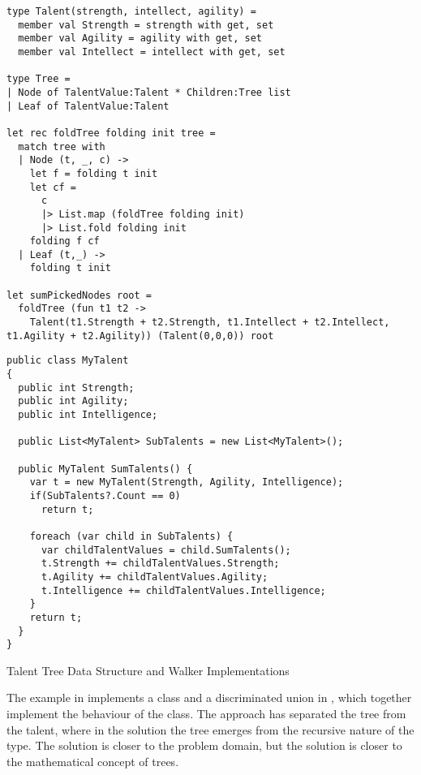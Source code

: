 \begin{listing}[H]
  \begin{verbatim}
type Talent(strength, intellect, agility) =
  member val Strength = strength with get, set
  member val Agility = agility with get, set
  member val Intellect = intellect with get, set

type Tree =
| Node of TalentValue:Talent * Children:Tree list
| Leaf of TalentValue:Talent

let rec foldTree folding init tree =
  match tree with
  | Node (t, _, c) ->
    let f = folding t init
    let cf =
      c
      |> List.map (foldTree folding init)
      |> List.fold folding init
    folding f cf
  | Leaf (t,_) ->
    folding t init

let sumPickedNodes root =
  foldTree (fun t1 t2 ->
    Talent(t1.Strength + t2.Strength, t1.Intellect + t2.Intellect, t1.Agility + t2.Agility)) (Talent(0,0,0)) root
  \end{verbatim}
  \begin{verbatim}
public class MyTalent
{
  public int Strength;
  public int Agility;
  public int Intelligence;

  public List<MyTalent> SubTalents = new List<MyTalent>();

  public MyTalent SumTalents() {
    var t = new MyTalent(Strength, Agility, Intelligence);
    if(SubTalents?.Count == 0)
      return t;

    foreach (var child in SubTalents) {
      var childTalentValues = child.SumTalents();
      t.Strength += childTalentValues.Strength;
      t.Agility += childTalentValues.Agility;
      t.Intelligence += childTalentValues.Intelligence;
    }
    return t;
  }
}
  \end{verbatim}
  \caption{Talent Tree Data Structure and Walker Implementations}
  \label{lst:tree-imps}
\end{listing}

The example in  implements a class and a discriminated union in \fs, which together implement the behaviour of the \cs class. The \fs approach has separated the tree from the talent, where in the  \cs solution the tree emerges from the recursive nature of the type. The \cs solution is closer to the problem domain, but the \fs solution is closer to the mathematical concept of trees.

